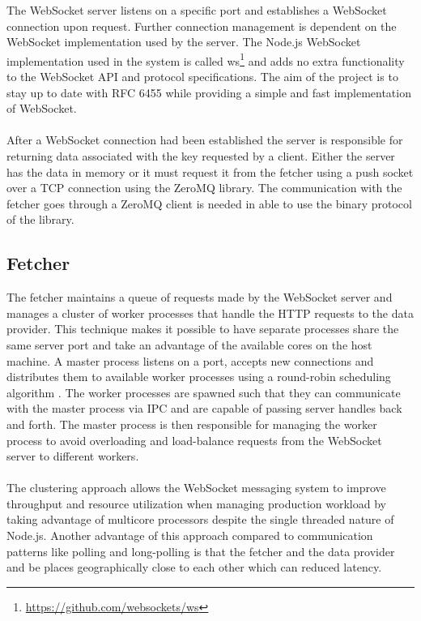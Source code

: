 The WebSocket server listens on a specific port and establishes a WebSocket connection upon request. Further connection management is dependent on the WebSocket implementation used by the server. The Node.js WebSocket implementation used in the system is called ws\footnote{\url{https://github.com/websockets/ws}} and adds no extra functionality to the WebSocket API and protocol specifications. The aim of the project is to stay up to date with RFC 6455 while providing a simple and fast implementation of WebSocket.
\\ \\
After a WebSocket connection had been established the server is responsible for returning data associated with the key requested by a client. Either the server has the data in memory or it must request it from the fetcher using a push socket over a TCP connection using the ZeroMQ library. The communication with the fetcher goes through a ZeroMQ client is needed in able to use the binary protocol of the library.

\subsection{Fetcher}

The fetcher maintains a queue of requests made by the WebSocket server and manages a cluster of worker processes that handle the HTTP requests to the data provider. This technique makes it possible to have separate processes share the same server port and take an advantage of the available cores on the host machine. A master process listens on a port, accepts new connections and distributes them to available worker processes using a round-robin scheduling algorithm \cite{nodeCluster}. The worker processes are spawned such that they can communicate with the master process via IPC and are capable of passing server handles back and forth. The master process is then responsible for managing the worker process to avoid overloading and load-balance requests from the WebSocket server to different workers.
\\ \\
The clustering approach allows the WebSocket messaging system to improve throughput and resource utilization when managing production workload by taking advantage of multicore processors despite the single threaded nature of Node.js. Another advantage of this approach compared to communication patterns like polling and long-polling is that the fetcher and the data provider and be places geographically close to each other which can reduced latency.

